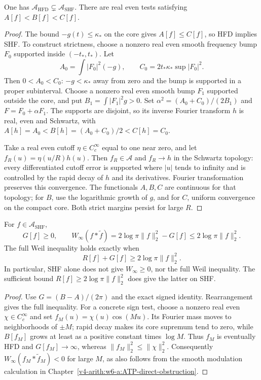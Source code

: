 \begin{lemma}
\label{v4-arith:w7-a:lem:SHF-vs-HFD}
One has \(\mathscr A_{\mathrm{HFD}}\subsetneq\mathscr A_{\mathrm{SHF}}\).
There are real even tests satisfying \(A[f]<B[f]<C[f]\).
\end{lemma}
\begin{proof}
The bound \(-g(t)\le\kappa_*\) on the core gives \(A[f]\le C[f]\),
so HFD implies SHF. To construct strictness, choose a nonzero real
even smooth frequency bump \(F_0\) supported inside \((-t_*,t_*)\).
Let
\[
 A_0=\int|F_0|^2(-g),\qquad
 C_0=2t_*\kappa_*\sup|F_0|^2.
\]
Then \(0<A_0<C_0\): \(-g<\kappa_*\) away from zero and the bump
is supported in a proper subinterval. Choose a nonzero real even
smooth bump \(F_1\) supported outside the core, and put
\(B_1=\int|F_1|^2g>0\). Set
\(\alpha^2=(A_0+C_0)/(2B_1)\) and \(F=F_0+\alpha F_1\).
The supports are disjoint, so its inverse Fourier transform \(h\)
is real, even and Schwartz, with
\(A[h]=A_0<B[h]=(A_0+C_0)/2<C[h]=C_0\).

Take a real even cutoff \(\eta\in C_c^\infty\) equal to one near
zero, and let \(f_R(u)=\eta(u/R)h(u)\). Then \(f_R\in\mathscr A\)
and \(f_R\to h\) in the Schwartz topology: every differentiated
cutoff error is supported where \(|u|\) tends to infinity and is
controlled by the rapid decay of \(h\) and its derivatives.
Fourier transformation preserves this convergence. The functionals
\(A,B,C\) are continuous for that topology; for \(B\), use the
logarithmic growth of \(g\), and for \(C\), uniform convergence on
the compact core. Both strict margins persist for large \(R\).
\end{proof}

\begin{theorem}
\label{v4-arith:w7-a:thm:SHF-ATP}
For \(f\in\mathscr A_{\mathrm{SHF}}\),
\[
 G[f]\ge0,\qquad
 W_\infty(f*\widetilde f)=2\log\pi\|f\|_2^2-G[f]
 \le2\log\pi\|f\|_2^2.
\]
The full Weil inequality holds exactly when
\[
 R[f]+G[f]\ge2\log\pi\|f\|_2^2.
\]
In particular, SHF alone does not give \(W_\infty\ge0\), nor the
full Weil inequality. The sufficient bound
\(R[f]\ge2\log\pi\|f\|_2^2\) does give the latter on SHF.
\end{theorem}
\begin{proof}
Use \(G=(B-A)/(2\pi)\) and the exact signed identity. Rearrangement
gives the full inequality. For a concrete sign test, choose a
nonzero real even \(\chi\in C_c^\infty\) and set
\(f_M(u)=\chi(u)\cos(Mu)\). Its Fourier mass moves to neighborhoods
of \(\pm M\); rapid decay makes its core supremum tend to zero,
while \(B[f_M]\) grows at least as a positive constant times
\(\log M\). Thus \(f_M\) is eventually HFD and \(G[f_M]\to\infty\),
whereas \(\|f_M\|_2^2\le\|\chi\|_2^2\). Consequently
\(W_\infty(f_M*\widetilde f_M)<0\) for large \(M\), as also follows
from the smooth modulation calculation in
Chapter~\ref{v4-arith:w6-a:ATP-direct-obstruction}.
\end{proof}

